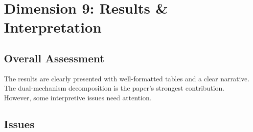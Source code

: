 \documentclass[12pt,a4paper]{article}
\begin{document}
\section{Dimension 9: Results \& Interpretation}

\subsection*{Overall Assessment}
The results are clearly presented with well-formatted tables and a clear narrative. The dual-mechanism decomposition is the paper's strongest contribution. However, some interpretive issues need attention.

\subsection*{Issues}
\end{document}

